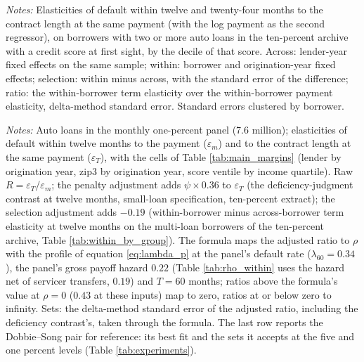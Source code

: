 \begin{table}[H]
\centering
\caption{The term margin across and within borrower, by score decile}
\label{tab:within_by_group}
\small
\resizebox{\textwidth}{!}{}
\vspace{0.5em}
\begin{minipage}{0.92\textwidth}
\noindent \small \textit{Notes:} Elasticities of default within twelve and twenty-four months to the contract length at the same payment (with the log payment as the second regressor), on borrowers with two or more auto loans in the ten-percent archive with a credit score at first sight, by the decile of that score. Across: lender-year fixed effects on the same sample; within: borrower and origination-year fixed effects; selection: within minus across, with the standard error of the difference; ratio: the within-borrower term elasticity over the within-borrower payment elasticity, delta-method standard error. Standard errors clustered by borrower.
\end{minipage}
\end{table}

\begin{table}[H]
\centering
\caption{The across-borrower term margin adjusted for the penalty and selection, pooled}
\label{tab:bureau_ladder}
\small
\resizebox{\textwidth}{!}{}
\vspace{0.5em}
\begin{minipage}{0.92\textwidth}
\noindent \small \textit{Notes:} Auto loans in the monthly one-percent panel (7.6 million); elasticities of default within twelve months to the payment ($\varepsilon_m$) and to the contract length at the same payment ($\varepsilon_T$), with the cells of Table \ref{tab:main_margins} (lender by origination year, zip3 by origination year, score ventile by income quartile). Raw $R = \varepsilon_T/\varepsilon_m$; the penalty adjustment adds $\psi \times 0.36$ to $\varepsilon_T$ (the deficiency-judgment contrast at twelve months, small-loan specification, ten-percent extract); the selection adjustment adds $-0.19$ (within-borrower minus across-borrower term elasticity at twelve months on the multi-loan borrowers of the ten-percent archive, Table \ref{tab:within_by_group}). The formula maps the adjusted ratio to $\rho$ with the profile of equation \eqref{eq:lambda_p} at the panel's default rate ($\lambda_{60} = 0.34$), the panel's gross payoff hazard $0.22$ (Table \ref{tab:rho_within} uses the hazard net of servicer transfers, $0.19$) and $T = 60$ months; ratios above the formula's value at $\rho = 0$ ($0.43$ at these inputs) map to zero, ratios at or below zero to infinity. Sets: the delta-method standard error of the adjusted ratio, including the deficiency contrast's, taken through the formula. The last row reports the Dobbie--Song pair for reference: its best fit and the sets it accepts at the five and one percent levels (Table \ref{tab:experiments}).
\end{minipage}
\end{table}


